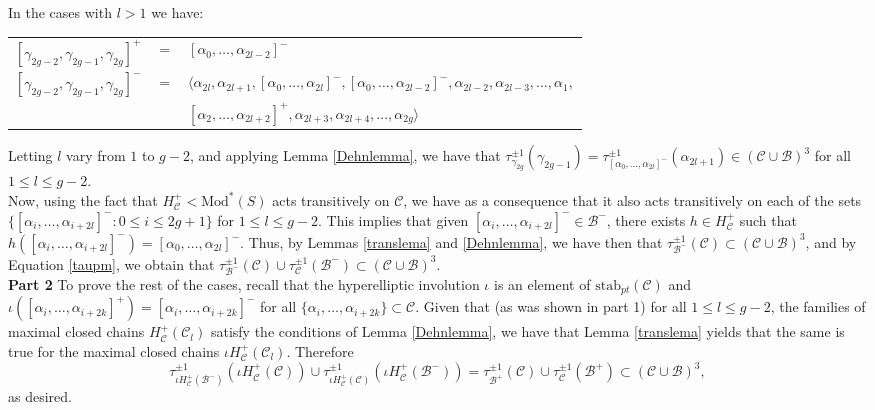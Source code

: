 \documentclass[twoside,11pt,a4paper]{article}
\newcommand*{\EMod}[1]{\mathrm{Mod}^{*}(#1)}
\newcommand*{\stab}[1]{\mathrm{stab}_{pt}(#1)}
\newcommand*{\Cf}{\mathscr{C}}
\newcommand*{\Bf}{\mathscr{B}}
\newcommand*{\Hcf}{H_{\Cf}}
\newcommand*{\Hcp}{\Hcf^{+}}
\begin{document}
\indent In the cases with $l > 1$ we have:
\begin{center}
\begin{tabular}{rcl}
 $[\gamma_{2g-2},\gamma_{2g-1},\gamma_{2g}]^{+}$ & $=$ & $[\alpha_{0},\ldots,\alpha_{2l-2}]^{-}$\\
 $[\gamma_{2g-2},\gamma_{2g-1},\gamma_{2g}]^{-}$ & $=$ & $\langle \alpha_{2l},\alpha_{2l+1},[\alpha_{0},\ldots,\alpha_{2l}]^{-},[\alpha_{0},\ldots,\alpha_{2l-2}]^{-}, \alpha_{2l-2}, \alpha_{2l-3}, \ldots, \alpha_{1},$\\
 & & $[\alpha_{2},\ldots,\alpha_{2l+2}]^{+}, \alpha_{2l+3},\alpha_{2l+4},\ldots, \alpha_{2g}\rangle$
\end{tabular}
\end{center}
\indent Letting $l$ vary from $1$ to $g-2$, and applying Lemma \ref{Dehnlemma}, we have that $\tau_{\gamma_{2g}}^{\pm 1}(\gamma_{2g-1}) = \tau_{[\alpha_{0},\ldots,\alpha_{2l}]^{-}}^{\pm 1}(\alpha_{2l+1}) \in (\Cf \cup \Bf)^{3}$ for all $1 \leq l \leq g-2$.\\
\indent Now, using the fact that $\Hcp < \EMod{S}$ acts transitively on $\Cf$, we have as a consequence that it also acts transitively on each of the sets $\{[\alpha_{i}, \ldots, \alpha_{i+2l}]^{-}: 0 \leq i \leq 2g+1\}$ for $1 \leq l \leq g-2$. This implies that given $[\alpha_{i}, \ldots, \alpha_{i+2l}]^{-} \in \Bf^{-}$, there exists $h \in \Hcp$ such that $h([\alpha_{i}, \ldots, \alpha_{i+2l}]^{-}) = [\alpha_{0},\ldots,\alpha_{2l}]^{-}$. Thus, by Lemmas \ref{translema} and \ref{Dehnlemma}, we have then that $\tau_{\Bf^{-}}^{\pm 1}(\Cf) \subset (\Cf \cup \Bf)^{3}$, and by Equation \ref{taupm}, we obtain that $\tau_{\Bf^{-}}^{\pm 1}(\Cf) \cup \tau_{\Cf}^{\pm 1}(\Bf^{-}) \subset (\Cf \cup \Bf)^{3}$.\\[0.3cm]
\textbf{Part 2} To prove the rest of the cases, recall that the hyperelliptic involution $\iota$ is an element of $\stab{\Cf}$ and $\iota([\alpha_{i}, \ldots, \alpha_{i+2k}]^{+}) = [\alpha_{i}, \ldots, \alpha_{i+2k}]^{-}$ for all $\{\alpha_{i}, \ldots, \alpha_{i+2k}\} \subset \Cf$. Given that (as was shown in part 1) for all $1 \leq l \leq g-2$, the families of maximal closed chains $\Hcp(\Cf_{l})$ satisfy the conditions of Lemma \ref{Dehnlemma}, we have that Lemma \ref{translema} yields that the same is true for the maximal closed chains $\iota\Hcp(\Cf_{l})$. Therefore $$\tau_{\iota\Hcp(\Bf^{-})}^{\pm 1}(\iota\Hcp(\Cf)) \cup \tau_{\iota\Hcp(\Cf)}^{\pm 1}(\iota\Hcp(\Bf^{-})) = \tau_{\Bf^{+}}^{\pm 1}(\Cf) \cup \tau_{\Cf}^{\pm 1}(\Bf^{+}) \subset (\Cf \cup \Bf)^{3},$$ as desired.
\end{document}
